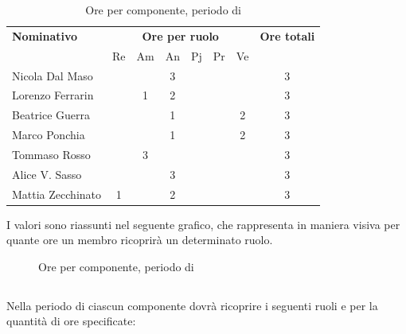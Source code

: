 \begin{table}[H]
	\centering
	\begin{tabular}{|l|c|c|c|c|c|c|c|}
		\hline
		\textbf{Nominativo} & 
		\multicolumn{6}{c|}{\textbf{Ore per ruolo}} & 
		\textbf{Ore totali} \\
		& Re & Am & An & Pj & Pr & Ve & \\
		\hline
		Nicola Dal Maso & & & 3 & & &  & 3 \\
		Lorenzo Ferrarin & & 1 & 2 & & &  & 3 \\
		Beatrice Guerra & & & 1 & & & 2 & 3 \\
		Marco Ponchia & & & 1 & & & 2 & 3 \\
		Tommaso Rosso & & 3 & & & & & 3 \\
		Alice V. Sasso & & & 3 & & & & 3 \\
		Mattia Zecchinato & 1 & & 2 & & & & 3 \\
		\hline
	\end{tabular}
	\caption{Ore per componente, periodo di \AD}
\end{table}
I valori sono riassunti nel seguente grafico, che rappresenta in maniera visiva per quante ore un membro ricoprirà un determinato ruolo.
\begin{figure}[H]
	\centering
	\caption{Ore per componente, periodo di \AD{}}
\end{figure}

\subsection{\PA}
Nella periodo di \PA{} ciascun componente dovrà ricoprire i seguenti ruoli e per la quantità di ore specificate:

